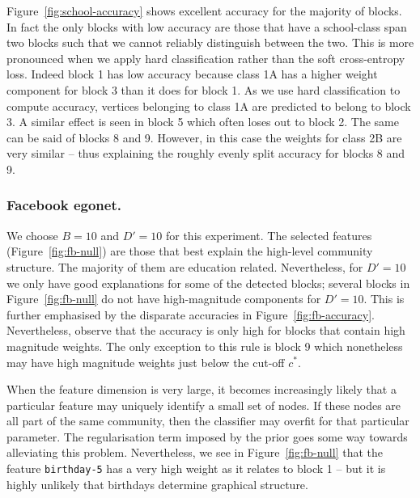 Figure~\ref{fig:school-accuracy} shows excellent accuracy for the majority of blocks. In fact the only blocks with low accuracy are those that have a school-class span two blocks such that we cannot reliably distinguish between the two. This is more pronounced when we apply hard classification rather than the soft cross-entropy loss. Indeed block 1 has low accuracy because class 1A has a higher weight component for block 3 than it does for block 1. As we use hard classification to compute accuracy, vertices belonging to class 1A are predicted to belong to block 3. A similar effect is seen in block 5 which often loses out to block 2. The same can be said of blocks 8 and 9. However, in this case the weights for class 2B are very similar -- thus explaining the roughly evenly split accuracy for blocks 8 and 9.

\subsubsection{Facebook egonet.}

We choose $B=10$ and $D'=10$ for this experiment. The selected features 
(Figure~\ref{fig:fb-null}) are those that best explain the high-level 
community structure. The majority of them are education related. 
Nevertheless, for $D'=10$ we only have good explanations for some of the detected blocks; several blocks in 
Figure~\ref{fig:fb-null} do not have high-magnitude components for $D'=10$. This is further emphasised by the disparate accuracies in Figure~\ref{fig:fb-accuracy}. Nevertheless, observe that the accuracy is only high for blocks that contain high magnitude weights. The only exception to this rule is block 9 which nonetheless may have high magnitude weights just below the cut-off $c^*$.

When the feature dimension is very large, it becomes increasingly likely that 
a particular feature may uniquely identify a small set of nodes. If these nodes 
are all part of the same community, then the classifier may overfit for that 
particular parameter. The regularisation term imposed by the prior goes some 
way towards alleviating this problem. Nevertheless, we see in 
Figure~\ref{fig:fb-null} that the feature \verb*|birthday-5| has a very 
high weight as it relates to block 1 -- but it is highly unlikely
that birthdays determine graphical structure.